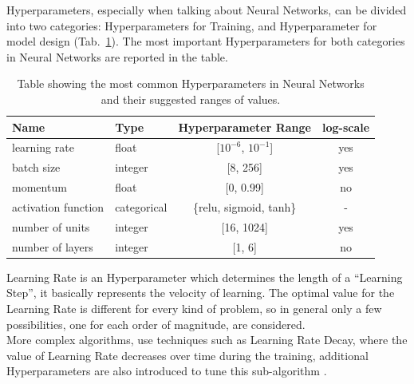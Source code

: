 Hyperparameters, especially when talking about Neural Networks, can be divided into two categories: Hyperparameters for Training, and Hyperparameter for model design (Tab.~\ref{tab:table-2.6.1}). The most important Hyperparameters for both categories in Neural Networks are reported in the table.
\begin{table}[ht!]
	\center
	\setlength{\tabcolsep}{0.5cm}
	\caption[Common Hyperparameters in Neural Networks]{Table showing the most common Hyperparameters in Neural Networks and their suggested ranges of values.}
	\begin{tabular}{@{}llcc@{}}
		\toprule
		\textbf{Name}       & \textbf{Type} & \multicolumn{1}{l}{\textbf{Hyperparameter Range}} & \multicolumn{1}{l}{\textbf{log-scale}} \\ \midrule
		learning rate       & float         & {[}$10^{-6}$, $10^{-1}${]}                        & yes                                    \\[0.1cm]
		batch size          & integer       & {[}8, 256{]}                                      & yes                                    \\[0.1cm]
		momentum            & float         & {[}0, 0.99{]}                                     & no                                     \\[0.1cm]
		activation function & categorical   & \{relu, sigmoid, tanh\}                           & -                                      \\[0.1cm]
		number of units     & integer       & {[}16, 1024{]}                                    & yes                                    \\[0.1cm]
		number of layers    & integer       & {[}1, 6{]}                                        & no                                     \\ \bottomrule
	\end{tabular}
	\label{tab:table-2.6.1}
\end{table}

Learning Rate is an Hyperparameter which determines the length of a “Learning Step”, it basically represents the velocity of learning.
The optimal value for the Learning Rate is different for every kind of problem, so in general only a few possibilities, one for each order of magnitude, are considered.
\\[0.3cm]More complex algorithms, use techniques such as Learning Rate Decay, where the value of Learning Rate decreases over time during the training, additional Hyperparameters are also introduced to tune this sub-algorithm \cite{Tesi-1.9}.

